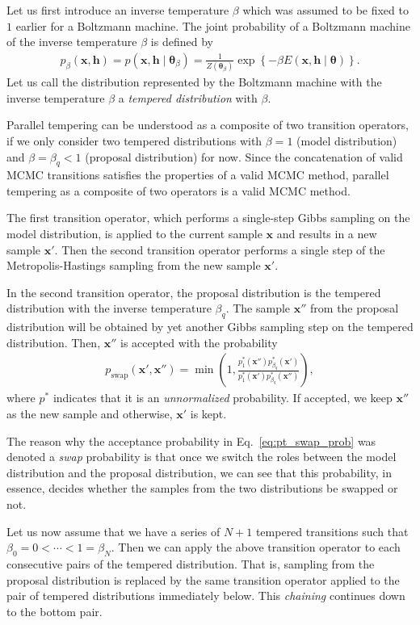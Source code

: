 \documentclass[dissertation,nocontribution,draft*]{aaltoseries}
\newcommand{\vect}[1]{\mathbf{#1}}
\newcommand{\vects}[1]{\boldsymbol{#1}}
\newcommand{\vh}[0]{\vect{h}}
\newcommand{\vx}[0]{\vect{x}}
\newcommand{\TT}[0]{{\vects{\theta}}}
\begin{document}
Let us first introduce an inverse temperature $\beta$
which was assumed to be fixed to $1$ earlier for a Boltzmann
machine. The joint probability
of a Boltzmann machine of the inverse temperature $\beta$ is defined by
\begin{align*}
    p_{\beta} (\vx, \vh) = p (\vx, \vh \mid \TT_\beta) =
    \frac{1}{Z(\TT_\beta)} \exp\left\{ -\beta E(\vx, \vh
    \mid \TT) \right\}.
\end{align*}
Let us call the distribution represented by the Boltzmann
machine with the inverse temperature $\beta$ a
\textit{tempered distribution} with $\beta$.

Parallel tempering can be understood as a composite of two
transition operators, if we only consider two
tempered distributions with $\beta=1$ (model distribution)
and $\beta = \beta_q < 1$ (proposal distribution) for now.  Since
the concatenation of valid MCMC transitions satisfies the
properties of a valid MCMC method, parallel tempering as a
composite of two operators is a valid MCMC method.

The first transition operator, which performs a single-step
Gibbs sampling on the model distribution, is applied to the
current sample $\vx$ and results in a new sample $\vx'$.
Then the second transition operator performs a single step
of the Metropolis-Hastings sampling from the new sample
$\vx'$.

In the second transition operator, the proposal distribution
is the tempered distribution with the inverse temperature
$\beta_q$. The sample $\vx''$ from the proposal distribution
will be obtained by yet another Gibbs sampling step on the
tempered distribution. Then, $\vx''$ is accepted with the
probability
\begin{align}
    \label{eq:pt_swap_prob}
    p_\text{swap} (\vx', \vx'') = \min \left( 1, \frac{p_1^*
    (\vx'') p^*_{\beta_q} (\vx')}{p^*_1(\vx')
    p^*_{\beta_q}(\vx'')}
    \right),
\end{align}
where $p^*$ indicates that it is an \textit{unnormalized}
probability. If accepted, we keep $\vx''$ as the new
sample and otherwise, $\vx'$ is kept.

The reason why the acceptance probability in
Eq.~\eqref{eq:pt_swap_prob} was denoted a \textit{swap}
probability is that once we switch the roles between the
model distribution and the proposal distribution, we can see
that this probability, in essence, decides whether the
samples from the two distributions be swapped or not.

Let us now assume that we have a series of $N+1$ tempered
transitions such that $\beta_0=0 < \cdots < 1 = \beta_N$.
Then we can apply the above transition operator to each
consecutive pairs of the tempered distribution. That is, 
sampling from the proposal distribution is replaced by the
same transition operator applied to the pair of tempered
distributions immediately below. This \textit{chaining}
continues down to the bottom pair.
\end{document}
